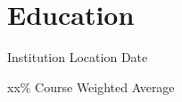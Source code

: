 
\section{Education}
 {Institution} {Location} {Date}
\begin{entryitems}
    \item{xx\% Course Weighted Average}
\end{entryitems}

